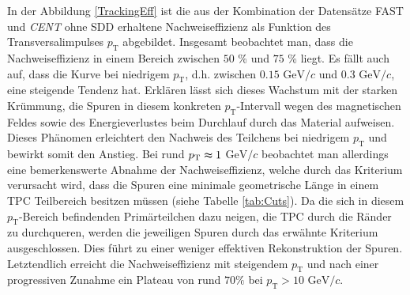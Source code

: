 \documentclass[12pt,a4paper]{report}
\begin{document}
\hspace{-0.1cm}In der Abbildung \ref{TrackingEff} ist die aus der Kombination der Datensätze \textsc{FAST} und \textit{CENT} ohne SDD erhaltene Nachweiseffizienz als Funktion des Transversalimpulses $p_{\mathrm{T}}$ abgebildet. Insgesamt beobachtet man, dass die Nachweiseffizienz in einem Bereich zwischen $50$ \% und $75$ \% liegt. Es fällt auch auf, dass die Kurve bei niedrigem $p_{\mathrm{T}}$, d.h. zwischen $0.15$ $\mathrm{GeV}/c$ und $0.3$ $\mathrm{GeV}/c$, eine steigende Tendenz hat. Erklären lässt sich dieses Wachstum mit der starken Krümmung, die Spuren in diesem konkreten $p_{\mathrm{T}}$-Intervall wegen des magnetischen Feldes sowie des Energieverlustes beim Durchlauf durch das Material aufweisen. Dieses Phänomen erleichtert den Nachweis des Teilchens bei niedrigem $p_{\mathrm{T}}$ und bewirkt somit den Anstieg. Bei rund \hspace{4cm} $p_{\mathrm{T}} \thickapprox 1$ $\mathrm{GeV}/c$ beobachtet man allerdings eine bemerkenswerte Abnahme der Nachweiseffizienz, welche durch das Kriterium verursacht wird, dass die Spuren eine minimale geometrische Länge in einem TPC Teilbereich besitzen müssen (siehe Tabelle \ref{tab:Cuts}). Da die sich in diesem $p_{\mathrm{T}}$-Bereich befindenden Primärteilchen dazu neigen, die TPC durch die Ränder zu durchqueren, werden die jeweiligen Spuren durch das erwähnte Kriterium ausgeschlossen. Dies führt zu einer weniger effektiven Rekonstruktion der Spuren. Letztendlich erreicht die Nachweiseffizienz mit steigendem $p_{\mathrm{T}}$ und nach einer progressiven Zunahme ein Plateau von rund $70\%$ bei $p_{\mathrm{T}} > 10$ $\mathrm{GeV}/c$.
\end{document}
